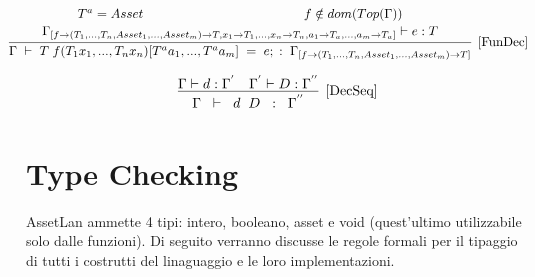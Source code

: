 \documentclass[12pt,twoside,openright,a4paper]{report}
\begin{document}
\vspace{1cm}


\begin{align*}
\hspace{-0.5cm} 
\infer[\mathrm{[FunDec]}]
{\Gamma  \hspace{0.1cm} \vdash \hspace{0.1cm} T \hspace{0.1cm} f(T_{1} x_{1}, ..., T_{n} x_{n})[T^{a} a_{1}, ..., T^{a} a_{m}] \hspace{0.1cm} = \hspace{0.1cm} e; \hspace{0.1cm} : \hspace{0.1cm}  \Gamma _{[f \to (T_{1},...,T_{n}, Asset_{1}, ..., Asset_{m}) \to T]}} 
{\deduce[]{\Gamma _{[f \to (T_{1},...,T_{n}, Asset_{1}, ..., Asset_{m}) \to T, x_{1} \to T_{1}, ..., x_{n} \to T_{n}, a_{1} \to T_{a}, ..., a_{m} \to T_{a}]}\vdash e : T }{T^{a} = Asset & \hspace{4cm}f \notin dom(Top(\Gamma)) } }
\end{align*}

\vspace{1.5cm}

\begin{align*}
\infer[\mathrm{[DecSeq]}]
{\Gamma  \hspace{0.2cm} \vdash \hspace{0.2cm} d \hspace{0.2cm} D \hspace{0.2cm} : \hspace{0.2cm} \Gamma ^{''}_{}} 
{  \Gamma \vdash d : \Gamma^{'} & \Gamma^{'} \vdash D : \Gamma^{''} }
\end{align*}

\newpage
\section{Type Checking}
AssetLan ammette 4 tipi: intero, booleano, asset e void (quest'ultimo utilizzabile solo dalle funzioni). Di seguito verranno discusse le regole formali per il tipaggio di tutti i costrutti del linaguaggio e le loro implementazioni.
\end{document}
